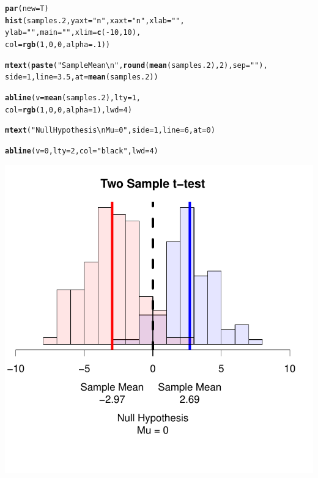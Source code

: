 \documentclass{tufte-book}\usepackage[]{graphicx}\usepackage[]{color}
\makeatletter
\def\maxwidth{ %
  \ifdim\Gin@nat@width>\linewidth
    \linewidth
  \else
    \Gin@nat@width
  \fi
}
\newcommand{\hlnum}[1]{\textcolor[rgb]{0.686,0.059,0.569}{#1}}%
\newcommand{\hlstr}[1]{\textcolor[rgb]{0.192,0.494,0.8}{#1}}%
\newcommand{\hlopt}[1]{\textcolor[rgb]{0,0,0}{#1}}%
\newcommand{\hlstd}[1]{\textcolor[rgb]{0.345,0.345,0.345}{#1}}%
\newcommand{\hlkwc}[1]{\textcolor[rgb]{0.333,0.667,0.333}{#1}}%
\newcommand{\hlkwd}[1]{\textcolor[rgb]{0.737,0.353,0.396}{\textbf{#1}}}%
\newenvironment{kframe}{%
 \def\at@end@of@kframe{}%
 \ifinner\ifhmode%
  \def\at@end@of@kframe{\end{minipage}}%
  \begin{minipage}{\columnwidth}%
 \fi\fi%
 \def\FrameCommand##1{\hskip\@totalleftmargin \hskip-\fboxsep
 \colorbox{shadecolor}{##1}\hskip-\fboxsep
     \hskip-\linewidth \hskip-\@totalleftmargin \hskip\columnwidth}%
 \MakeFramed {\advance\hsize-\width
   \@totalleftmargin\z@ \linewidth\hsize
   \@setminipage}}%
 {\par\unskip\endMakeFramed%
 \at@end@of@kframe}
\newenvironment{knitrout}{}{} %
\makeatother
\begin{document}
\begin{marginfigure}
\begin{tiny}
\begin{knitrout}
\begin{kframe}
\begin{alltt}
\hlkwd{par}\hlstd{(}\hlkwc{new} \hlstd{= T)}
\hlkwd{hist}\hlstd{(samples.2,} \hlkwc{yaxt} \hlstd{=} \hlstr{"n"}\hlstd{,} \hlkwc{xaxt} \hlstd{=} \hlstr{"n"}\hlstd{,} \hlkwc{xlab} \hlstd{=} \hlstr{""}\hlstd{,}
     \hlkwc{ylab} \hlstd{=} \hlstr{""}\hlstd{,} \hlkwc{main} \hlstd{=} \hlstr{""}\hlstd{,} \hlkwc{xlim} \hlstd{=} \hlkwd{c}\hlstd{(}\hlopt{-}\hlnum{10}\hlstd{,} \hlnum{10}\hlstd{),}
     \hlkwc{col} \hlstd{=} \hlkwd{rgb}\hlstd{(}\hlnum{1}\hlstd{,} \hlnum{0}\hlstd{,} \hlnum{0}\hlstd{,} \hlkwc{alpha} \hlstd{=} \hlnum{.1}\hlstd{))}

\hlkwd{mtext}\hlstd{(}\hlkwd{paste}\hlstd{(}\hlstr{"Sample Mean\textbackslash{}n"}\hlstd{,} \hlkwd{round}\hlstd{(}\hlkwd{mean}\hlstd{(samples.2),} \hlnum{2}\hlstd{),} \hlkwc{sep} \hlstd{=} \hlstr{""}\hlstd{),}
      \hlkwc{side} \hlstd{=} \hlnum{1}\hlstd{,} \hlkwc{line} \hlstd{=} \hlnum{3.5}\hlstd{,} \hlkwc{at} \hlstd{=} \hlkwd{mean}\hlstd{(samples.2))}

\hlkwd{abline}\hlstd{(}\hlkwc{v} \hlstd{=} \hlkwd{mean}\hlstd{(samples.2),} \hlkwc{lty} \hlstd{=} \hlnum{1}\hlstd{,}
       \hlkwc{col} \hlstd{=} \hlkwd{rgb}\hlstd{(}\hlnum{1}\hlstd{,} \hlnum{0}\hlstd{,} \hlnum{0}\hlstd{,} \hlkwc{alpha} \hlstd{=} \hlnum{1}\hlstd{),} \hlkwc{lwd} \hlstd{=} \hlnum{4}\hlstd{)}

\hlkwd{mtext}\hlstd{(}\hlstr{"Null Hypothesis\textbackslash{}nMu = 0"}\hlstd{,} \hlkwc{side} \hlstd{=} \hlnum{1}\hlstd{,} \hlkwc{line} \hlstd{=} \hlnum{6}\hlstd{,} \hlkwc{at} \hlstd{=}\hlnum{0}\hlstd{)}

\hlkwd{abline}\hlstd{(}\hlkwc{v} \hlstd{=} \hlnum{0}\hlstd{,} \hlkwc{lty} \hlstd{=} \hlnum{2}\hlstd{,} \hlkwc{col} \hlstd{=} \hlstr{"black"}\hlstd{,} \hlkwc{lwd} \hlstd{=} \hlnum{4}\hlstd{)}
\end{alltt}
\end{kframe}
\includegraphics[width=\maxwidth]{figure/unnamed-chunk-255-1} 


\end{knitrout}
\end{tiny}
\end{marginfigure}
\end{document}
